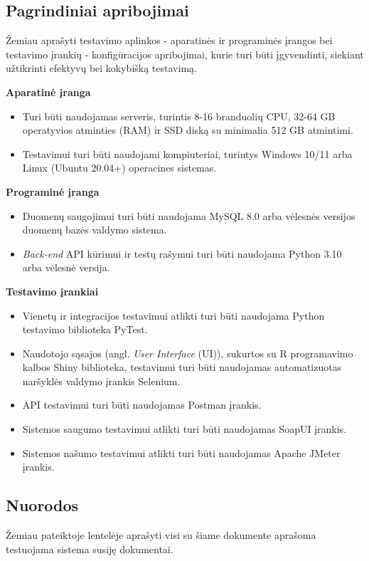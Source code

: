 \documentclass[12pt]{article}
\begin{document}
\subsection{Pagrindiniai apribojimai}
Žemiau aprašyti testavimo aplinkos - aparatinės ir programinės įrangos bei
testavimo įrankių - konfigūracijos apribojimai, kurie turi būti įgyvendinti,
siekiant užtikrinti efektyvų bei kokybišką testavimą.

\vskip 10pt

\noindent \textbf{Aparatinė įranga}
\begin{itemize}
    \item Turi būti naudojamas serveris, turintis 8-16 branduolių CPU,
    32-64 GB operatyvios atminties (RAM) ir SSD diską su minimalia 512 GB
    atmintimi.
    \item Testavimui turi būti naudojami kompiuteriai, turintys Windows 10/11
    arba Linux (Ubuntu 20.04+) operacines sistemas.
\end{itemize}

\noindent \textbf{Programinė įranga}
\begin{itemize}
    \item Duomenų saugojimui turi būti naudojama MySQL 8.0 arba vėlesnės
    versijos duomenų bazės valdymo sistema.
    \item \emph{Back-end} API kūrimui ir testų rašymui turi būti naudojama
    Python 3.10 arba vėlesnė versija.
\end{itemize}

\noindent \textbf{Testavimo įrankiai}
\begin{itemize}
    \item Vienetų ir integracijos testavimui atlikti turi būti naudojama Python
    testavimo biblioteka PyTest.
    \item Naudotojo sąsajos (angl. \emph{User Interface} (UI)), sukurtos su R
    programavimo kalbos Shiny biblioteka, testavimui turi būti naudojamas
    automatizuotas naršyklės valdymo įrankis Selenium.
    \item API testavimui turi būti naudojamas Postman įrankis.
    \item Sistemos saugumo testavimui atlikti turi būti naudojamas SoapUI
    įrankis.
    \item Sistemos našumo testavimui atlikti turi būti naudojamas Apache JMeter
    įrankis.
\end{itemize}

\newpage

\subsection{Nuorodos}
Žemiau pateiktoje lentelėje aprašyti visi su šiame dokumente aprašoma testuojama
sistema susiję dokumentai.
\end{document}
